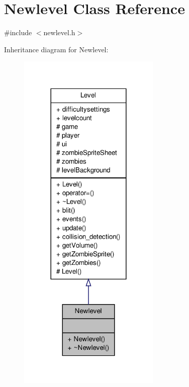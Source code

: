 \hypertarget{classNewlevel}{\section{Newlevel Class Reference}
\label{classNewlevel}
}


{\ttfamily \#include $<$newlevel.\-h$>$}



Inheritance diagram for Newlevel\-:\nopagebreak
\begin{figure}[H]
\begin{center}
\leavevmode
\includegraphics[width=192pt]{classNewlevel__inherit__graph}
\end{center}
\end{figure}


